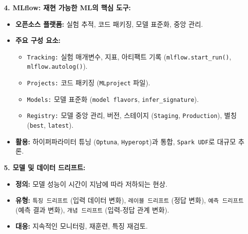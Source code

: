 \documentclass[11pt,a4paper]{article}
\begin{document}
\begin{tcolorbox}[summarybox={CSCI103 Lecture 8: 재현 가능한 머신러닝 핵심 요약}]
\textbf{4. MLflow: 재현 가능한 ML의 핵심 도구:}
\begin{itemize}
    \item \textbf{오픈소스 플랫폼:} 실험 추적, 코드 패키징, 모델 표준화, 중앙 관리.
    \item \textbf{주요 구성 요소:}
    \begin{itemize}
        \item \texttt{Tracking:} 실험 매개변수, 지표, 아티팩트 기록 (\texttt{mlflow.start_run()}, \texttt{mlflow.autolog()}).
        \item \texttt{Projects:} 코드 패키징 (\texttt{MLproject} 파일).
        \item \texttt{Models:} 모델 표준화 (\texttt{model flavors}, \texttt{infer_signature}).
        \item \texttt{Registry:} 모델 중앙 관리, 버전, 스테이지 (\texttt{Staging}, \texttt{Production}), 별칭 (\texttt{best}, \texttt{latest}).
    \end{itemize}
    \item \textbf{활용:} 하이퍼파라미터 튜닝 (\texttt{Optuna}, \texttt{Hyperopt})과 통합, \texttt{Spark UDF}로 대규모 추론.
\end{itemize}

\textbf{5. 모델 및 데이터 드리프트:}
\begin{itemize}
    \item \textbf{정의:} 모델 성능이 시간이 지남에 따라 저하되는 현상.
    \item \textbf{유형:} \texttt{특징 드리프트} (입력 데이터 변화), \texttt{레이블 드리프트} (정답 변화), \texttt{예측 드리프트} (예측 결과 변화), \texttt{개념 드리프트} (입력-정답 관계 변화).
    \item \textbf{대응:} 지속적인 모니터링, 재훈련, 특징 재검토.
\end{itemize}
\end{tcolorbox}
\end{document}
